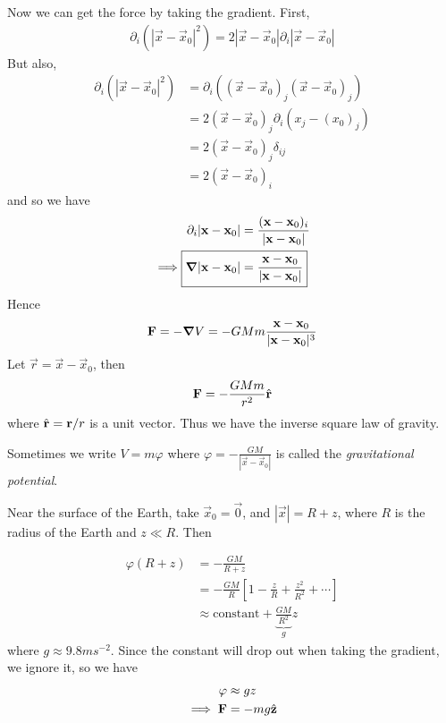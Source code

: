 \documentclass{../template/note}
\begin{document}
    Now we can get the force by taking the gradient. First,
    \begin{align*}
        \partial_i \left(|\vec x-\vec x_0|^2\right) = 2|\vec x - \vec x_0| \partial_i |\vec x - \vec x_0|
    \end{align*}
    But also,
    \begin{align*}
        \partial_i \left(|\vec x-\vec x_0|^2\right) &= \partial_i \left((\vec x-\vec x_0)_j(\vec x-\vec x_0)_j\right) \\
        &= 2(\vec x - \vec x_0)_j \partial_i(x_j - (x_0)_j) \\
        &= 2(\vec x - \vec x_0)_j \delta_{ij} \\
        &= 2(\vec x - \vec x_0)_i
    \end{align*}
    and so we have
    \begin{align*}
        \partial_i|\vec x - \vec x_0| &= \frac{(\vec x - \vec x_0)_i}{|\vec x - \vec x_0|} \\
        \implies \Aboxed{\grad |\vec x - \vec x_0| &= \frac{\vec x - \vec x_0}{|\vec x - \vec x_0|}}
    \end{align*}
    Hence
    \begin{align*}
        \vec F = -\grad V = -GMm \frac{\vec x - \vec x_0}{|\vec x - \vec x_0|^3}
    \end{align*}
    Let \(\vec r = \vec x - \vec x_0\), then
    \begin{align*}
        \vec F = -\frac{GMm}{r^2} \hvec r
    \end{align*}
    where \(\hvec r = \vec r / r\) is a unit vector. Thus we have the inverse square law of gravity.

    \begin{remark*}
        Sometimes we write \(V = m\varphi\) where \(\varphi = -\frac{GM}{|\vec x - \vec x_0|}\) is called the \emph{gravitational potential}. 
    \end{remark*}
    
    Near the surface of the Earth, take \(\vec x_0 = \vec 0\), and \(|\vec x| = R + z\), where \(R\) is the radius of the Earth and \(z \ll R\). Then

    \begin{align*}
        \varphi(R + z) &= -\frac{GM}{R+z} \\
        &= -\frac{GM}{R}\left[1-\frac{z}{R}+\frac{z^2}{R^2} + \cdots\right] \\
        &\approx \text{constant} + \underbrace{\frac{GM}{R^2}}_{g}z
    \end{align*}
    where \(g \approx 9.8 \si{ms^{-2}}\). Since the constant will drop out when taking the gradient, we ignore it, so we have
    \begin{align*}
        \varphi &\approx gz \\
        \implies \vec F &= -mg \hvec z
    \end{align*}
    
\end{document}
